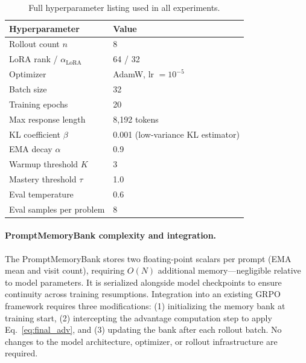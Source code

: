 \documentclass[11pt]{article}
\theoremstyle{definition}
\begin{document}
\begin{table}[h]
\centering
\caption{Full hyperparameter listing used in all experiments.}
\label{tab:hyperparams_full}
\small
\begin{tabular}{ll}
\toprule
\textbf{Hyperparameter} & \textbf{Value} \\
\midrule
Rollout count $n$                          & 8 \\
LoRA rank / $\alpha_{\mathrm{LoRA}}$       & 64 / 32 \\
Optimizer                                  & AdamW, lr $= 10^{-5}$ \\
Batch size                                 & 32 \\
Training epochs                            & 20 \\
Max response length                        & 8{,}192 tokens \\
KL coefficient $\beta$                     & 0.001 (low-variance KL estimator) \\
EMA decay $\alpha$                         & 0.9 \\
Warmup threshold $K$                       & 3 \\
Mastery threshold $\tau$                   & 1.0 \\
Eval temperature                           & 0.6 \\
Eval samples per problem                   & 8 \\
\bottomrule
\end{tabular}
\end{table}

\paragraph{PromptMemoryBank complexity and integration.}
The PromptMemoryBank stores two floating-point scalars per prompt (EMA mean
and visit count), requiring $O(N)$ additional memory—negligible relative to
model parameters.
It is serialized alongside model checkpoints to ensure continuity across
training resumptions.
Integration into an existing GRPO framework requires three modifications:
(1) initializing the memory bank at training start,
(2) intercepting the advantage computation step to apply Eq.~\eqref{eq:final_adv},
and (3) updating the bank after each rollout batch.
No changes to the model architecture, optimizer, or rollout infrastructure
are required.

\end{document}
